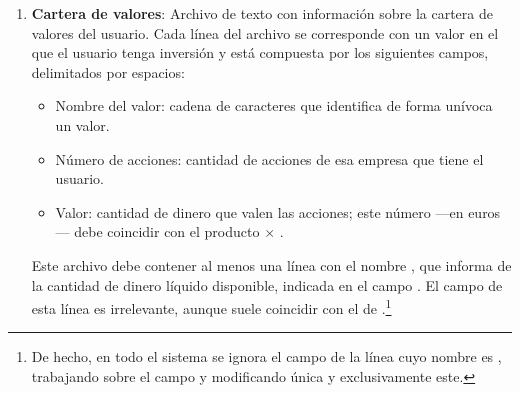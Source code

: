 \documentclass[a4paper, 11pt, titlepage]{article}
\begin{document}
    \begin{enumerate}
        \item \textbf{Cartera de valores}: Archivo de texto con información sobre la cartera de valores del usuario. Cada línea del archivo se corresponde con un valor en el que el usuario tenga inversión y está compuesta por los siguientes campos, delimitados por espacios:
        \begin{itemize}
            \item Nombre del valor: cadena de caracteres que identifica de forma unívoca un valor.
            \item Número de acciones: cantidad de acciones de esa empresa que tiene el usuario.
            \item Valor: cantidad de dinero que valen las acciones; este número ---en euros--- debe coincidir con el producto  $\times$ .
        \end{itemize}
        Este archivo debe contener al menos una línea con el nombre , que informa de la cantidad de dinero líquido disponible, indicada en el campo . El campo  de esta línea es irrelevante, aunque suele coincidir con el de .\footnote{De hecho, en todo el sistema se ignora el campo  de la línea cuyo nombre es , trabajando sobre el campo  y modificando única y exclusivamente este.}


\end{enumerate}
\end{document}

